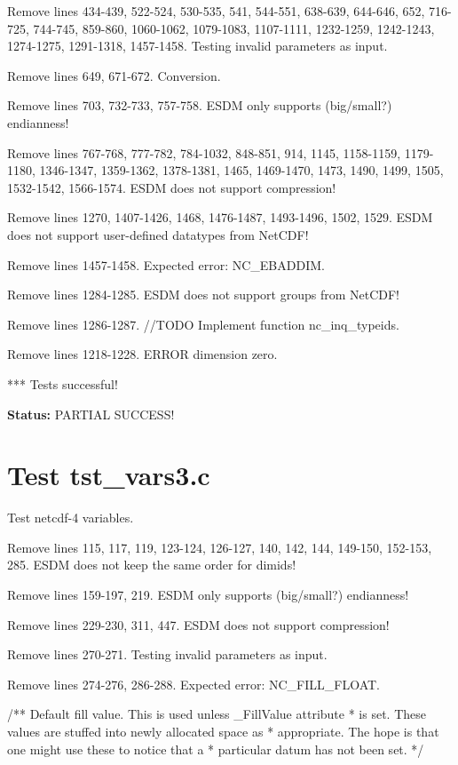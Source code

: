 Remove lines 434-439, 522-524, 530-535, 541, 544-551, 638-639, 644-646, 652, 716-725, 744-745, 859-860, 1060-1062, 1079-1083, 1107-1111, 1232-1259, 1242-1243, 1274-1275, 1291-1318, 1457-1458. Testing invalid parameters as input.

Remove lines 649, 671-672. Conversion.

Remove lines 703, 732-733, 757-758. ESDM only supports (big/small?) endianness!

Remove lines 767-768, 777-782, 784-1032, 848-851, 914, 1145, 1158-1159, 1179-1180, 1346-1347, 1359-1362, 1378-1381, 1465, 1469-1470, 1473, 1490, 1499, 1505, 1532-1542, 1566-1574. ESDM does not support compression!

Remove lines 1270, 1407-1426, 1468, 1476-1487, 1493-1496, 1502, 1529. ESDM does not support user-defined datatypes from NetCDF!

Remove lines 1457-1458. Expected error: NC\_EBADDIM.

Remove lines 1284-1285. ESDM does not support groups from NetCDF!

Remove lines 1286-1287. //TODO Implement function nc\_inq\_typeids.

Remove lines 1218-1228. ERROR dimension zero.

*** Tests successful!

{\bf \large Status: } PARTIAL SUCCESS!

\section{Test tst\_vars3.c}

Test netcdf-4 variables.

Remove lines 115, 117, 119, 123-124, 126-127, 140, 142, 144, 149-150, 152-153, 285. ESDM does not keep the same order for dimids!

Remove lines 159-197, 219. ESDM only supports (big/small?) endianness!

Remove lines 229-230, 311, 447. ESDM does not support compression!

Remove lines 270-271. Testing invalid parameters as input.

Remove lines 274-276, 286-288. Expected error: NC\_FILL\_FLOAT.

/** Default fill value. This is used unless \_FillValue attribute
 * is set.  These values are stuffed into newly allocated space as
 * appropriate.  The hope is that one might use these to notice that a
 * particular datum has not been set. */

